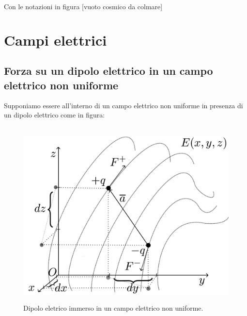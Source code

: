 \documentclass[11pt]{article}
\begin{document}
               Con le notazioni in figura
[vuoto cosmico da colmare]
\section{Campi elettrici}
\subsection{Forza su un dipolo elettrico in un campo elettrico non uniforme}
Supponiamo essere all'interno di un campo elettrico non uniforme in presenza di un dipolo elettrico come in figura:
 \begin{center}
\begin{figure}[H]
			  \vspace{-16pt}
              \hspace{-90pt}
              ~~~~~~~~~~~~~~~~~~~~~~~~~~~~~~~~ \includegraphics[scale=0.20]{dipolononuniforme1}
               \caption{\small{Dipolo eletrico immerso in un campo elettrico non uniforme.}}
               \end{figure} 
               \end{center}
\end{document}
